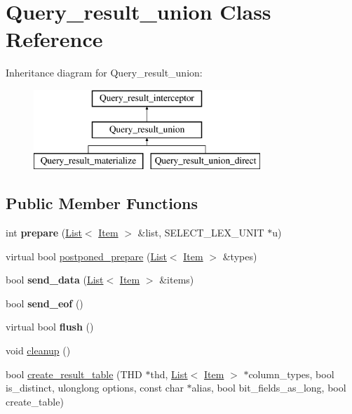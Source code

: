 \hypertarget{classQuery__result__union}{}\section{Query\+\_\+result\+\_\+union Class Reference}
\label{classQuery__result__union}
Inheritance diagram for Query\+\_\+result\+\_\+union\+:\begin{figure}[H]
\begin{center}
\leavevmode
\includegraphics[height=3.000000cm]{classQuery__result__union}
\end{center}
\end{figure}
\subsection*{Public Member Functions}
\begin{DoxyCompactItemize}
\item 
\mbox{\label{classQuery__result__union_a6d06ea913a8d192a662f035d0c691e23}} 
int {\bfseries prepare} (\mbox{\hyperlink{classList}{List}}$<$ \mbox{\hyperlink{classItem}{Item}} $>$ \&list, S\+E\+L\+E\+C\+T\+\_\+\+L\+E\+X\+\_\+\+U\+N\+IT $\ast$u)
\item 
virtual bool \mbox{\hyperlink{classQuery__result__union_ad110a83be28d4f91cfd4c7c534defcc9}{postponed\+\_\+prepare}} (\mbox{\hyperlink{classList}{List}}$<$ \mbox{\hyperlink{classItem}{Item}} $>$ \&types)
\item 
\mbox{\label{classQuery__result__union_a3ead2cb4d67c6246adf2a91b31387355}} 
bool {\bfseries send\+\_\+data} (\mbox{\hyperlink{classList}{List}}$<$ \mbox{\hyperlink{classItem}{Item}} $>$ \&items)
\item 
\mbox{\label{classQuery__result__union_ad4f828a3be0b5367341e8f2a1a838132}} 
bool {\bfseries send\+\_\+eof} ()
\item 
\mbox{\label{classQuery__result__union_a589932080b51b7e32d0c53c199be7541}} 
virtual bool {\bfseries flush} ()
\item 
void \mbox{\hyperlink{classQuery__result__union_aa4640fb9c092f60d01389ae784486863}{cleanup}} ()
\item 
bool \mbox{\hyperlink{classQuery__result__union_a354c2b031a23e5d027e68a2490f0932b}{create\+\_\+result\+\_\+table}} (T\+HD $\ast$thd, \mbox{\hyperlink{classList}{List}}$<$ \mbox{\hyperlink{classItem}{Item}} $>$ $\ast$column\+\_\+types, bool is\+\_\+distinct, ulonglong options, const char $\ast$alias, bool bit\+\_\+fields\+\_\+as\+\_\+long, bool create\+\_\+table)
\end{DoxyCompactItemize}
